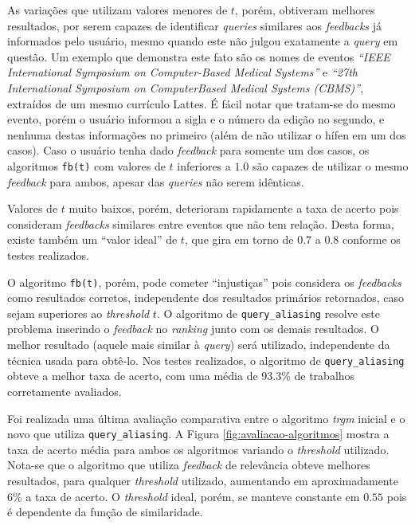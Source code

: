 \documentclass[12pt]{article}
\newcommand{\quotes}[1]{``#1''}
\begin{document}
As variações que utilizam valores menores de $t$, porém, obtiveram melhores resultados, por serem capazes de identificar \textit{queries} similares aos \textit{feedbacks} já informados pelo usuário, mesmo quando este não julgou exatamente a \textit{query} em questão. Um exemplo que demonstra este fato são os nomes de eventos \textit{\quotes{IEEE International Symposium on Computer-Based Medical Systems}} e \textit{\quotes{27th International Symposium on ComputerBased Medical Systems (CBMS)}}, extraídos de um mesmo currículo Lattes. É fácil notar que tratam-se do mesmo evento, porém o usuário informou a sigla e o número da edição no segundo, e nenhuma destas informações no primeiro (além de não utilizar o hífen em um dos casos). Caso o usuário tenha dado \textit{feedback} para somente um dos casos, os algoritmos \texttt{fb(t)} com valores de $t$ inferiores a $1.0$ são capazes de utilizar o mesmo \textit{feedback} para ambos, apesar das \textit{queries} não serem idênticas.

Valores de $t$ muito baixos, porém, deterioram rapidamente a taxa de acerto pois consideram \textit{feedbacks} similares entre eventos que não tem relação. Desta forma, existe também um \quotes{valor ideal} de $t$, que gira em torno de $0.7$ a $0.8$ conforme os testes realizados.

O algoritmo \texttt{fb(t)}, porém, pode cometer \quotes{injustiças} pois considera os \textit{feedbacks} como resultados corretos, independente dos resultados primários retornados, caso sejam superiores ao \textit{threshold} $t$. O algoritmo de \texttt{query\_aliasing} resolve este problema inserindo o \textit{feedback} no \textit{ranking} junto com os demais resultados. O melhor resultado (aquele mais similar à \textit{query}) será utilizado, independente da técnica usada para obtê-lo. Nos testes realizados, o algoritmo de \texttt{query\_aliasing} obteve a melhor taxa de acerto, com uma média de 93.3\% de trabalhos corretamente avaliados.

Foi realizada uma última avaliação comparativa entre o algoritmo \textit{trgm} inicial e o novo que utiliza \texttt{query\_aliasing}. A Figura \ref{fig:avaliacao-algoritmos} mostra a taxa de acerto média para ambos os algoritmos variando o \textit{threshold} utilizado. Nota-se que o algoritmo que utiliza \textit{feedback} de relevância obteve melhores resultados, para qualquer \textit{threshold} utilizado, aumentando em aproximadamente 6\% a taxa de acerto. O \textit{threshold} ideal, porém, se manteve constante em $0.55$ pois é dependente da função de similaridade.
\end{document}
